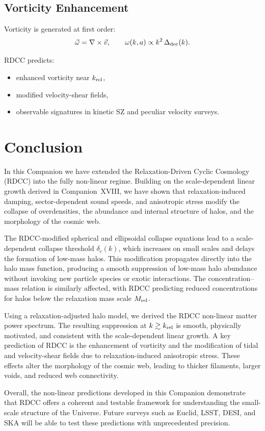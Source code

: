 \documentclass[11pt,a4paper]{article}
\begin{document}
\subsection{Vorticity Enhancement}

Vorticity is generated at first order:
\begin{equation}
\vec{\omega} = \nabla \times \vec{v},
\qquad
\omega(k,a) \propto k^2\,\Delta_{\rm dec}(k).
\end{equation}

RDCC predicts:
\begin{itemize}
\item enhanced vorticity near $k_{\rm rel}$,
\item modified velocity-shear fields,
\item observable signatures in kinetic SZ and peculiar velocity surveys.
\end{itemize}

\section{Conclusion}

In this Companion we have extended the Relaxation-Driven Cyclic Cosmology (RDCC) into the
fully non-linear regime. Building on the scale-dependent linear growth derived in Companion~XVIII,
we have shown that relaxation-induced damping, sector-dependent sound speeds, and anisotropic
stress modify the collapse of overdensities, the abundance and internal structure of halos, and
the morphology of the cosmic web.

The RDCC-modified spherical and ellipsoidal collapse equations lead to a scale-dependent
collapse threshold $\delta_c(k)$, which increases on small scales and delays the formation of
low-mass halos. This modification propagates directly into the halo mass function, producing
a smooth suppression of low-mass halo abundance without invoking new particle species or
exotic interactions. The concentration–mass relation is similarly affected, with RDCC predicting
reduced concentrations for halos below the relaxation mass scale $M_{\rm rel}$.

Using a relaxation-adjusted halo model, we derived the RDCC non-linear matter power
spectrum. The resulting suppression at $k \gtrsim k_{\rm rel}$ is smooth, physically motivated,
and consistent with the scale-dependent linear growth. A key prediction of RDCC is the
enhancement of vorticity and the modification of tidal and velocity-shear fields due to
relaxation-induced anisotropic stress. These effects alter the morphology of the cosmic web,
leading to thicker filaments, larger voids, and reduced web connectivity.

Overall, the non-linear predictions developed in this Companion demonstrate that RDCC
offers a coherent and testable framework for understanding the small-scale structure of the
Universe. Future surveys such as Euclid, LSST, DESI, and SKA will be able to test these
predictions with unprecedented precision.
\end{document}
